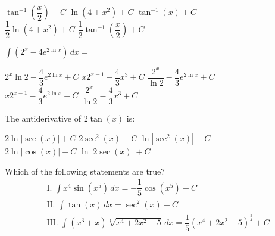 \begin{questions}
    \begin{oneparchoices}
        \choice $\tan^{-1} \left(\dfrac{x}{2}\right) + C$
        \choice $\ln \left(4 + x^2\right) + C$
        \choice $\tan^{-1} (x) + C$ \\[11pt]
        \makebox[0.20\textwidth] \choice $\dfrac{1}{2}\ln \left(4 + x^2\right) + C$
        \makebox[0.22\textwidth] \choice $\dfrac{1}{2}\tan^{-1} \left(\dfrac{x}{2}\right) + C$
    \end{oneparchoices} \par \horizontalline

    \question $\int \left(2^x - 4e^{2\ln x}\right) \, dx = $ \\

    \begin{oneparchoices}
        \choice $2^x\ln 2 - \dfrac{4}{3}e^{2\ln x} + C$
        \choice $x2^{x - 1} - \dfrac{4}{3}x^3 + C$
        \choice $\dfrac{2^x}{\ln 2} - \dfrac{4}{3}e^{2\ln x} + C$ \\[11pt]
        \makebox[0.19\textwidth] \choice $x2^{x - 1} - \dfrac{4}{3}e^{2\ln x} + C$
        \makebox[0.19\textwidth] \choice $\dfrac{2^x}{\ln 2} - \dfrac{4}{3}x^3 + C$
    \end{oneparchoices} \par \horizontalline

    \question The antiderivative of $2\tan (x)$ is: \\

    \begin{oneparchoices}
        \choice $2\ln |\sec (x)| + C$ 
        \choice $2\sec^2 (x) + C$
        \choice $\ln |\sec^2 (x)| + C$ \\[11pt]
        \makebox[0.21\textwidth] \choice $2\ln |\cos (x)| + C$
        \makebox[0.22\textwidth] \choice $\ln |2\sec (x)| + C$
    \end{oneparchoices} \par \horizontalline

    \question Which of the following statements are true? \begin{align*}
        & \text{I. } \int x^4\sin \left(x^5\right) \, dx = -\dfrac{1}{5}\cos \left(x^5\right) + C \\[11pt]
        & \text{II. } \int \tan (x) \, dx = \sec^2 (x) + C \\[11pt]
        & \text{III. } \int \left(x^3 + x\right)\sqrt[4]{x^4 + 2x^2 - 5} \, dx = \dfrac{1}{5}\left(x^4 + 2x^2 - 5\right)^{\frac{5}{4}} + C
    \end{align*}


\end{questions}
